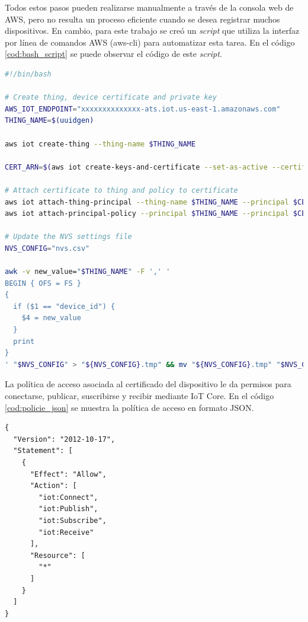 Todos estos pasos pueden realizarse manualmente a través de la consola web de AWS, pero no resulta un proceso eficiente cuando se desea registrar muchos dispositivos. En cambio, para este trabajo se creó un \textit{script} que utiliza la interfaz por línea de comandos AWS (aws-cli) \cite{awscli_info} para automatizar esta tarea. En el código \ref{cod:bash_script} se puede observar el código de este \textit{script}.

\begin{lstlisting}[language=bash, label=cod:bash_script, caption=\textit{Script} para automatizar el registro de un dispositivo en AWS IoT Core.]
#!/bin/bash

# Create thing, device certificate and private key
AWS_IOT_ENDPOINT="xxxxxxxxxxxxxx-ats.iot.us-east-1.amazonaws.com"
THING_NAME=$(uuidgen)

aws iot create-thing --thing-name $THING_NAME

CERT_ARN=$(aws iot create-keys-and-certificate --set-as-active --certificate-pem-outfile device.pem.crt --private-key-outfile private.pem.key --query 'certificateArn' --output text)

# Attach certificate to thing and policy to certificate
aws iot attach-thing-principal --thing-name $THING_NAME --principal $CERT_ARN
aws iot attach-principal-policy --principal $THING_NAME --principal $CERT_ARN --policy-name IOT_ACCESS

# Update the NVS settings file
NVS_CONFIG="nvs.csv"

awk -v new_value="$THING_NAME" -F ',' '
BEGIN { OFS = FS }
{
  if ($1 == "device_id") {
    $4 = new_value
  }
  print
}
' "$NVS_CONFIG" > "${NVS_CONFIG}.tmp" && mv "${NVS_CONFIG}.tmp" "$NVS_CONFIG"
\end{lstlisting}

La política de acceso asociada al certificado del dispositivo le da permisos para conectarse, publicar, suscribirse y recibir mediante IoT Core. En el código \ref{cod:policie_json} se muestra la política de acceso en formato JSON.

\begin{lstlisting}[label=cod:policie_json,caption=Política de acceso asociada a los certificados de los dispositivos.]
{
  "Version": "2012-10-17",
  "Statement": [
    {
      "Effect": "Allow",
      "Action": [
        "iot:Connect",
        "iot:Publish",
        "iot:Subscribe",
        "iot:Receive"
      ],
      "Resource": [
        "*"
      ]
    }
  ]
}
\end{lstlisting}

